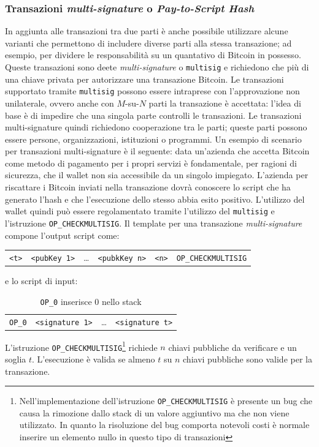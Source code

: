 \subsubsection{Transazioni \textit{multi-signature} o \textit{Pay-to-Script Hash}}
In aggiunta alle transazioni tra due parti è anche possibile utilizzare alcune varianti che permettono di includere diverse parti alla stessa transazione; ad esempio, per dividere le responsabilità su un quantativo di Bitcoin in possesso. Queste transazioni sono deete \textit{multi-signature} o \texttt{multisig} e richiedono che più di una chiave privata per autorizzare una transazione Bitcoin. Le transazioni supportato tramite \texttt{multisig} possono essere intraprese con l'approvazione non unilaterale, ovvero anche con $M$-su-$N$ parti la transazione è accettata: l'idea di base è di impedire che una singola parte controlli le transazioni. Le transazioni multi-signature quindi richiedono cooperazione tra le parti; queste parti possono essere persone, organizzazioni, istituzioni o programmi.\newline
Un esempio di scenario per transazioni multi-signature è il seguente: data un'azienda che accetta Bitcoin come metodo di pagamento per i propri servizi è fondamentale, per ragioni di sicurezza, che il wallet non sia accessibile da un singolo impiegato. L'azienda per riscattare i Bitcoin inviati nella transazione dovrà conoscere lo script che ha generato l'hash e che l'esecuzione dello stesso abbia esito positivo.
L'utilizzo del wallet quindi può essere regolamentato tramite l'utilizzo del \texttt{multisig} e l'istruzione \texttt{OP\_CHECKMULTISIG}.\newline
Il template per una transazione \textit{multi-signature} compone l'output script come:
\begin{table}[H]
    \centering
    \begin{tabular}{c|c|c|c|c|c}
        \texttt{<t>} & \texttt{<pubKey 1>} & \dots & \texttt{<pubkKey n>} & \texttt{<n>} & \texttt{OP\_CHECKMULTISIG}
    \end{tabular}
\end{table}
e lo script di input:
\begin{table}[H]
    \caption{\texttt{OP\_0} inserisce $0$ nello stack}
    \centering
    \begin{tabular}{c|c|c|c}
        \texttt{OP\_0} & \texttt{<signature 1>} & \dots & \texttt{<signature t>}
    \end{tabular}
\end{table}
L'istruzione \texttt{OP\_CHECKMULTISIG}\footnote{Nell'implementazione dell'istruzione \texttt{OP\_CHECKMULTISIG} è presente un bug che causa la rimozione dallo stack di un valore aggiuntivo ma che non viene utilizzato. In quanto la risoluzione del bug comporta notevoli costi è normale inserire un elemento nullo in questo tipo di transazioni} richiede $n$ chiavi pubbliche da verificare e un soglia $t$. L'esecuzione è valida se almeno $t$ su $n$ chiavi pubbliche sono valide per la transazione.\newline
